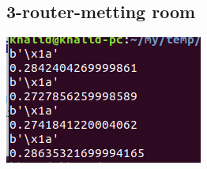 \documentclass[12pt]{article}
\begin{document}
\begin{CJK}{UTF8}{gbsn}
\section{3-router-metting room}
  \includegraphics[width=\textwidth]{./3-router-metting-room.png}
% 

\end{CJK}
\end{document}
